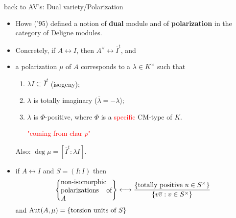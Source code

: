 \documentclass[handout]{beamer}
\begin{document}
\begin{frame}{ back to AV's: Dual variety/Polarization }
\begin{itemize}
 \item Howe ('95) defined a notion of \textbf{dual} module and of \textbf{polarization} in the category of Deligne modules.
\pause \item Concretely, if $A\leftrightarrow I$, then $A^\vee \leftrightarrow \overline{I}^t$, and
\pause \item a polarization $\mu$ of $A$ corresponds to a $\lambda\in K^\times$ such that
      \begin{enumerate}[-]
       \item $\lambda I \subseteq \overline{I}^t$ (isogeny);
       \item $\lambda$ is totally imaginary ($\overline \lambda = -\lambda$);
       \item $\lambda$ is $\Phi$-positive, where $\Phi$ is a \textcolor{red}{specific} CM-type of $K$. \textcolor{red}{\parbox{6em}{\center "coming from char $p$"}}
      \end{enumerate} 
      Also: $\deg \mu= [\overline{I}^t : \lambda I]$.
\pause  \item if $A \leftrightarrow I$ and $S=(I:I)$ then
  \[\set{\parbox[p]{7.5em}{non-isomorphic polarizations of $A$}} \longleftrightarrow \dfrac{\set{\text{totally positive }u\in S^\times }}{\set{v\overline{v}: v\in S^\times}}\]
  and $\operatorname{Aut}(A,\mu) = \left\lbrace\text{torsion units of $S$}\right\rbrace$
\end{itemize}
\end{frame}
\end{document}

